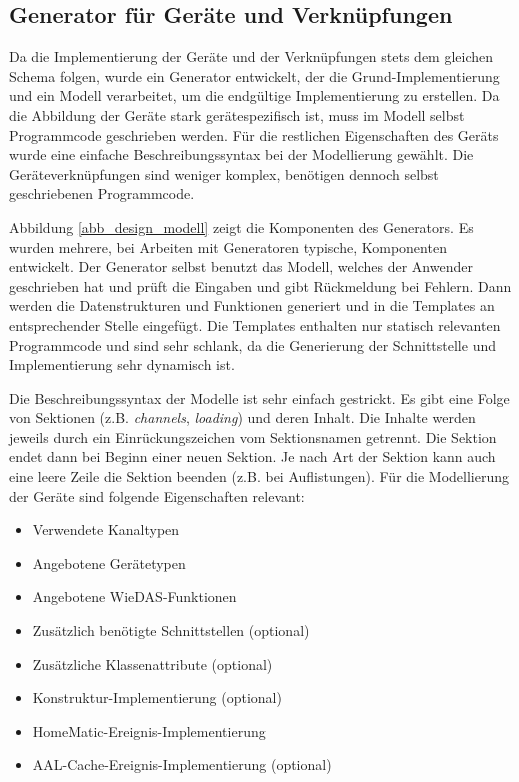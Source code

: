 \subsection{Generator für Geräte und Verknüpfungen}
\label{des_gen}
Da die Implementierung der Geräte und der Verknüpfungen stets dem gleichen Schema folgen, wurde ein Generator
entwickelt, der die Grund-Implementierung und ein Modell verarbeitet, um die endgültige Implementierung zu erstellen.
Da die Abbildung der Geräte stark gerätespezifisch ist, muss im Modell selbst Programmcode geschrieben werden.
Für die restlichen Eigenschaften des Geräts wurde eine einfache Beschreibungssyntax bei der Modellierung
gewählt.
Die Geräteverknüpfungen sind weniger komplex, benötigen dennoch selbst geschriebenen Programmcode.

Abbildung \ref{abb_design_modell} zeigt die Komponenten des Generators.
Es wurden mehrere, bei Arbeiten mit Generatoren typische, Komponenten entwickelt.
Der Generator selbst benutzt das Modell, welches der Anwender geschrieben hat und prüft die Eingaben
und gibt Rückmeldung bei Fehlern.
Dann werden die Datenstrukturen und Funktionen generiert und in die Templates an entsprechender
Stelle eingefügt.
Die Templates enthalten nur statisch relevanten Programmcode und sind sehr schlank, da die Generierung
der Schnittstelle und Implementierung sehr dynamisch ist.

Die Beschreibungssyntax der Modelle ist sehr einfach gestrickt.
Es gibt eine Folge von Sektionen (z.B. \emph{channels}, \emph{loading}) und deren Inhalt.
Die Inhalte werden jeweils durch ein Einrückungszeichen vom Sektionsnamen getrennt.
Die Sektion endet dann bei Beginn einer neuen Sektion.
Je nach Art der Sektion kann auch eine leere Zeile die Sektion beenden (z.B. bei Auflistungen).
Für die Modellierung der Geräte sind folgende Eigenschaften relevant:
\begin{itemize}
\item Verwendete Kanaltypen
\item Angebotene Gerätetypen
\item Angebotene WieDAS-Funktionen
\item Zusätzlich benötigte Schnittstellen (optional)
\item Zusätzliche Klassenattribute (optional)
\item Konstruktur-Implementierung (optional)
\item HomeMatic-Ereignis-Implementierung
\item AAL-Cache-Ereignis-Implementierung (optional)
\end{itemize}

